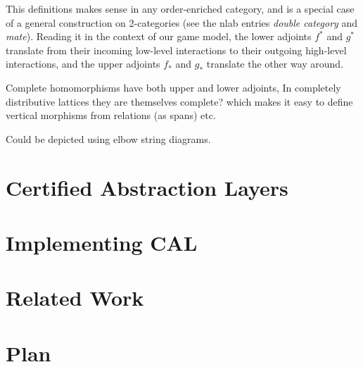 \documentclass[sigplan,10pt,review,anonymous]{acmart}
\begin{document}
This definitions makes sense in any order-enriched category,
and is a special case of a general construction on 2-categories
(see the nlab entries \emph{double category} and \emph{mate}).
Reading it in the context of our game model,
the lower adjoints $f^*$ and $g^*$
translate from their incoming low-level interactions
to their outgoing high-level interactions,
and the upper adjoints $f_*$ and $g_*$
translate the other way around.

Complete homomorphisms have both upper and lower adjoints,
In completely distributive lattices
they are themselves complete?
which makes it easy to define vertical morphisms
from relations (as spans) etc.

Could be depicted using elbow string diagrams.



\section{Certified Abstraction Layers}

\section{Implementing CAL}

\section{Related Work}

\appendix

\section*{Plan} %
\end{document}
